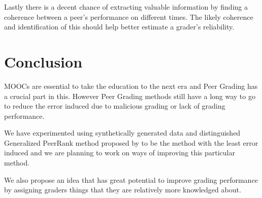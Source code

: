 \documentclass[a4paper]{article}
\begin{document}
Lastly there is a decent chance of extracting valuable information by finding a coherence between 
a peer's performance on different times. The likely coherence and identification of this should 
help better estimate a grader's reliability.

\section{Conclusion}
MOOCs are essential to take the education to the next era and Peer Grading has a crucial part in
this. However Peer Grading methods still have a long way to go to reduce the error induced due to malicious grading or lack of grading performance.

We have experimented using synthetically generated data and distinguished Generalized PeerRank method proposed by \cite{Walsh14a} to be the method with the least error induced and we are planning to work on ways of improving this particular method.

We also propose an idea that has great potential to improve grading performance by assigning graders things that they are relatively more knowledged about.
\clearpage
{}
\end{document}
